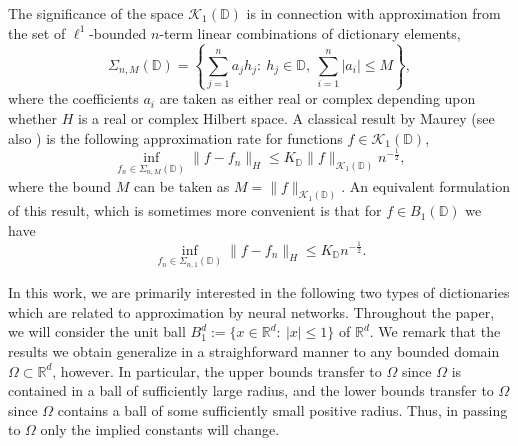The significance of the space $\mathcal{K}_1(\mathbb{D})$ is in connection with approximation from the set of $\ell^1$-bounded $n$-term linear combinations of dictionary elements,
\begin{equation}
 \Sigma_{n,M}(\mathbb{D}) = \left\{\sum_{j=1}^n a_jh_j:~h_j\in \mathbb{D},~\sum_{i=1}^n|a_i|\leq M\right\},
\end{equation}
where the coefficients $a_i$ are taken as either real or complex depending upon whether $H$ is a real or complex Hilbert space. A classical result by Maurey \cite{pisier1981remarques} (see also \cite{jones1992simple,barron1993universal,devore1998nonlinear}) is the following approximation rate for functions $f\in \mathcal{K}_1(\mathbb{D})$,
\begin{equation}\label{fundamental-bound}
 \inf_{f_n\in \Sigma_{n,M}(\mathbb{D})} \|f - f_n\|_H \leq K_\mathbb{D}\|f\|_{\mathcal{K}_1(\mathbb{D})}n^{-\frac{1}{2}},
\end{equation}
where the bound $M$ can be taken as $M = \|f\|_{\mathcal{K}_1(\mathbb{D})}$. An equivalent formulation of this result, which is sometimes more convenient is that for $f\in B_1(\mathbb{D})$ we have
\begin{equation}
 \inf_{f_n\in \Sigma_{n,1}(\mathbb{D})} \|f - f_n\|_H \leq K_\mathbb{D}n^{-\frac{1}{2}}.
\end{equation}

In this work, we are primarily interested in the following two types of dictionaries which are related to approximation by neural networks. Throughout the paper, we will consider the unit ball $B_1^d := \{x\in \mathbb{R}^d:~|x| \leq 1\}$ of $\mathbb{R}^d$. We remark that the results we obtain generalize in a straighforward manner to any bounded domain $\Omega\subset \mathbb{R}^d$, however. In particular, the upper bounds transfer to $\Omega$ since $\Omega$ is contained in a ball of sufficiently large radius, and the lower bounds transfer to $\Omega$ since $\Omega$ contains a ball of some sufficiently small positive radius. Thus, in passing to $\Omega$ only the implied constants will change.

